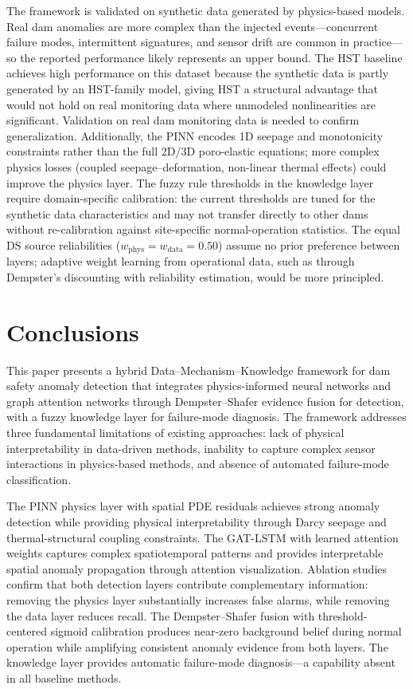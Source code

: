 \documentclass[preprint,12pt,review]{elsarticle}
\begin{document}
The framework is validated on synthetic data generated by physics-based models. Real dam anomalies are more complex than the injected events---concurrent failure modes, intermittent signatures, and sensor drift are common in practice---so the reported performance likely represents an upper bound. The HST baseline achieves high performance on this dataset because the synthetic data is partly generated by an HST-family model, giving HST a structural advantage that would not hold on real monitoring data where unmodeled nonlinearities are significant. Validation on real dam monitoring data is needed to confirm generalization. Additionally, the PINN encodes 1D seepage and monotonicity constraints rather than the full 2D/3D poro-elastic equations; more complex physics losses (coupled seepage--deformation, non-linear thermal effects) could improve the physics layer. The fuzzy rule thresholds in the knowledge layer require domain-specific calibration: the current thresholds are tuned for the synthetic data characteristics and may not transfer directly to other dams without re-calibration against site-specific normal-operation statistics. The equal DS source reliabilities ($w_{\mathrm{phys}} = w_{\mathrm{data}} = 0.50$) assume no prior preference between layers; adaptive weight learning from operational data, such as through Dempster's discounting with reliability estimation, would be more principled.

\section{Conclusions}
\label{sec:conclusions}

This paper presents a hybrid Data--Mechanism--Knowledge framework for dam safety anomaly detection that integrates physics-informed neural networks and graph attention networks through Dempster--Shafer evidence fusion for detection, with a fuzzy knowledge layer for failure-mode diagnosis. The framework addresses three fundamental limitations of existing approaches: lack of physical interpretability in data-driven methods, inability to capture complex sensor interactions in physics-based methods, and absence of automated failure-mode classification.

The PINN physics layer with spatial PDE residuals achieves strong anomaly detection while providing physical interpretability through Darcy seepage and thermal-structural coupling constraints. The GAT-LSTM with learned attention weights captures complex spatiotemporal patterns and provides interpretable spatial anomaly propagation through attention visualization. Ablation studies confirm that both detection layers contribute complementary information: removing the physics layer substantially increases false alarms, while removing the data layer reduces recall. The Dempster--Shafer fusion with threshold-centered sigmoid calibration produces near-zero background belief during normal operation while amplifying consistent anomaly evidence from both layers. The knowledge layer provides automatic failure-mode diagnosis---a capability absent in all baseline methods.
\end{document}
